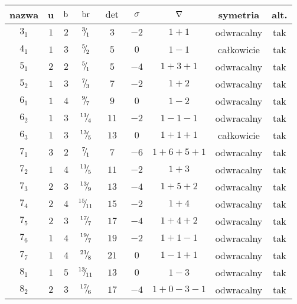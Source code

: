\renewcommand*{\arraystretch}{1.4}
\footnotesize
\begin{longtable}{ccccccccc}
\hline
nazwa & u & $\operatorname{b}$ & $\operatorname{br}$ & $\det$ & $\sigma$ & $\nabla$ & symetria & alt. \\ \hline
\endhead %
$3_{1}$ & $1$ & $2$ & ${}^{3}{\mskip -5mu/\mskip -3mu}_{1}$ & $3$ & $-2$ & $1+1$ & odwracalny & tak \\
$4_{1}$ & $1$ & $3$ & ${}^{5}{\mskip -5mu/\mskip -3mu}_{2}$ & $5$ & $0$ & $1-1$ & całkowicie & tak \\
$5_{1}$ & $2$ & $2$ & ${}^{5}{\mskip -5mu/\mskip -3mu}_{1}$ & $5$ & $-4$ & $1+3+1$ & odwracalny & tak \\
$5_{2}$ & $1$ & $3$ & ${}^{7}{\mskip -5mu/\mskip -3mu}_{3}$ & $7$ & $-2$ & $1+2$ & odwracalny & tak \\
$6_{1}$ & $1$ & $4$ & ${}^{9}{\mskip -5mu/\mskip -3mu}_{7}$ & $9$ & $0$ & $1-2$ & odwracalny & tak \\
$6_{2}$ & $1$ & $3$ & ${}^{11}{\mskip -5mu/\mskip -3mu}_{4}$ & $11$ & $-2$ & $1-1-1$ & odwracalny & tak \\
$6_{3}$ & $1$ & $3$ & ${}^{13}{\mskip -5mu/\mskip -3mu}_{5}$ & $13$ & $0$ & $1+1+1$ & całkowicie & tak \\
$7_{1}$ & $3$ & $2$ & ${}^{7}{\mskip -5mu/\mskip -3mu}_{1}$ & $7$ & $-6$ & $1+6+5+1$ & odwracalny & tak \\
$7_{2}$ & $1$ & $4$ & ${}^{11}{\mskip -5mu/\mskip -3mu}_{5}$ & $11$ & $-2$ & $1+3$ & odwracalny & tak \\
$7_{3}$ & $2$ & $3$ & ${}^{13}{\mskip -5mu/\mskip -3mu}_{9}$ & $13$ & $-4$ & $1+5+2$ & odwracalny & tak \\
$7_{4}$ & $2$ & $4$ & ${}^{15}{\mskip -5mu/\mskip -3mu}_{11}$ & $15$ & $-2$ & $1+4$ & odwracalny & tak \\
$7_{5}$ & $2$ & $3$ & ${}^{17}{\mskip -5mu/\mskip -3mu}_{7}$ & $17$ & $-4$ & $1+4+2$ & odwracalny & tak \\
$7_{6}$ & $1$ & $4$ & ${}^{19}{\mskip -5mu/\mskip -3mu}_{7}$ & $19$ & $-2$ & $1+1-1$ & odwracalny & tak \\
$7_{7}$ & $1$ & $4$ & ${}^{21}{\mskip -5mu/\mskip -3mu}_{8}$ & $21$ & $0$ & $1-1+1$ & odwracalny & tak \\
$8_{1}$ & $1$ & $5$ & ${}^{13}{\mskip -5mu/\mskip -3mu}_{11}$ & $13$ & $0$ & $1-3$ & odwracalny & tak \\
$8_{2}$ & $2$ & $3$ & ${}^{17}{\mskip -5mu/\mskip -3mu}_{6}$ & $17$ & $-4$ & $1+0-3-1$ & odwracalny & tak \\

\end{longtable}
